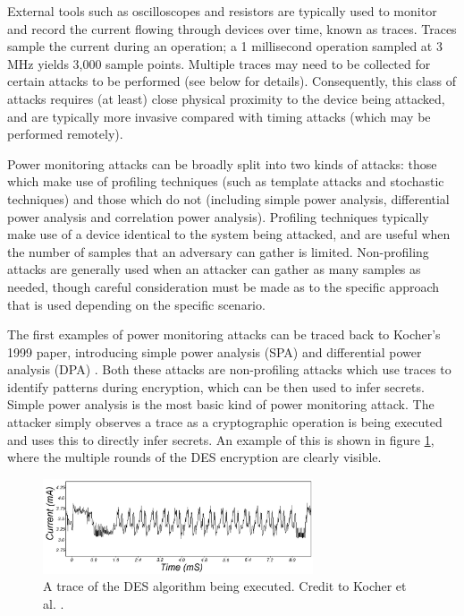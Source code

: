\documentclass[a4paper,oneside,11pt]{article}
\begin{document}
External tools such as oscilloscopes and resistors are typically used to
monitor and record the current flowing through devices over time, known as
traces. Traces sample the current during an operation; a 1 millisecond
operation sampled at 3 MHz yields 3,000 sample points. Multiple traces may need
to be collected for certain attacks to be performed (see below for details).
Consequently, this class of attacks requires (at least) close physical
proximity to the device being attacked, and are typically more invasive
compared with timing attacks (which may be performed remotely).

Power monitoring attacks can be broadly split into two kinds of attacks: those
which make use of profiling techniques (such as template attacks and stochastic
techniques) and those which do not (including simple power analysis,
differential power analysis and correlation power analysis). Profiling
techniques typically make use of a device identical to the system being
attacked, and are useful when the number of samples that an adversary can
gather is limited. Non-profiling attacks are generally used when an attacker
can gather as many samples as needed, though careful consideration must be made 
as to the specific approach that is used depending on the specific scenario.

The first examples of power monitoring attacks can be traced back to Kocher's
1999 paper, introducing simple power analysis (SPA) and differential power
analysis (DPA) \cite{A/Kocher-1999-DPA}. Both these attacks are non-profiling
attacks which use traces to identify patterns during encryption, which can be
then used to infer secrets. Simple power analysis is the most basic kind of
power monitoring attack. The attacker simply observes a trace as a
cryptographic operation is being executed and uses this to directly infer
secrets. An example of this is shown in figure \ref{fig:des-trace-spa}, where
the multiple rounds of the DES encryption are clearly visible.

\begin{figure}[h]
	\centering

	\includegraphics[width=8cm]{des-trace-spa}

	\caption{A trace of the DES algorithm being executed. Credit to Kocher
	et al. \cite{A/Kocher-1999-DPA}.}
	\label{fig:des-trace-spa}
\end{figure}
\end{document}
